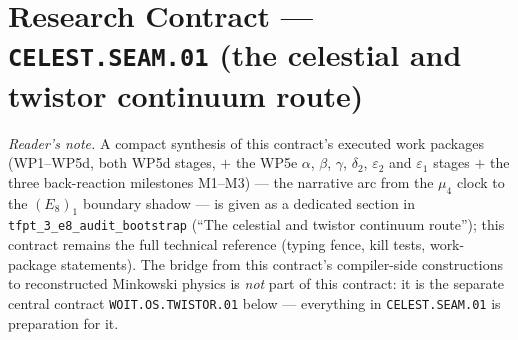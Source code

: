 \documentclass[11pt,a4paper]{article}
\begin{document}
\section*{Research Contract --- \texttt{CELEST.SEAM.01} (the celestial and twistor continuum route)}
\noindent\emph{Reader's note.} A compact synthesis of this contract's executed work packages
(WP1--WP5d, both WP5d stages, $+$ the WP5e $\alpha$, $\beta$, $\gamma$, $\delta_2$,
$\varepsilon_2$ and $\varepsilon_1$ stages $+$ the three back-reaction milestones M1--M3) --- the narrative arc from the $\mu_4$ clock to the $(E_8)_1$ boundary shadow --- is given as
a dedicated section in \texttt{tfpt\_3\_e8\_audit\_bootstrap} (``The celestial and twistor continuum
route''); this contract remains the full technical reference (typing
fence, kill tests, work-package statements). The bridge from this contract's compiler-side
constructions to reconstructed Minkowski physics is \emph{not} part of this contract: it is the
separate central contract \texttt{WOIT.OS.TWISTOR.01} below --- everything in \texttt{CELEST.SEAM.01}
is preparation for it.
\end{document}

